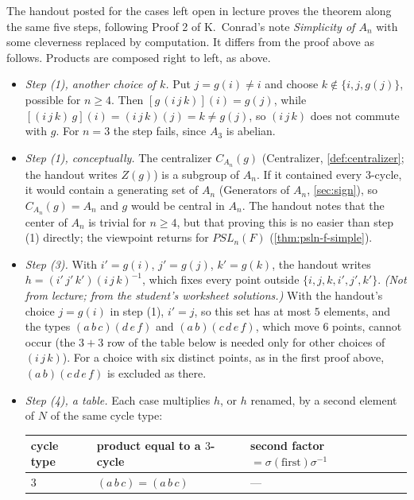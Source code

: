 \documentclass[11pt]{report}
\begin{document}
\begin{rembox}\label{rem:handout-simplicity-an}
The handout posted for the cases left open in lecture proves the theorem along the same five steps, following Proof 2 of K.~Conrad's note \emph{Simplicity of $A_n$} with some cleverness replaced by computation. It differs from the proof above as follows. Products are composed right to left, as above.
\begin{itemize}
    \item \emph{Step (1), another choice of $k$.} Put $j = g(i) \neq i$ and choose $k \notin \{i, j, g(j)\}$, possible for $n \geq 4$. Then $[g\,(i\,j\,k)](i) = g(j)$, while $[(i\,j\,k)\,g](i) = (i\,j\,k)(j) = k \neq g(j)$, so $(i\,j\,k)$ does not commute with $g$. For $n = 3$ the step fails, since $A_3$ is abelian.
    \item \emph{Step (1), conceptually.} The centralizer $C_{A_n}(g)$ (Centralizer, \ref{def:centralizer}; the handout writes $Z(g)$) is a subgroup of $A_n$. If it contained every $3$-cycle, it would contain a generating set of $A_n$ (Generators of $A_n$, \ref{sec:sign}), so $C_{A_n}(g) = A_n$ and $g$ would be central in $A_n$. The handout notes that the center of $A_n$ is trivial for $n \geq 4$, but that proving this is no easier than step (1) directly; the viewpoint returns for $PSL_n(F)$ (\ref{thm:psln-f-simple}).
    \item \emph{Step (3).} With $i' = g(i)$, $j' = g(j)$, $k' = g(k)$, the handout writes $h = (i'\,j'\,k')(i\,j\,k)^{-1}$, which fixes every point outside $\{i, j, k, i', j', k'\}$. \textit{(Not from lecture; from the student's worksheet solutions.)} With the handout's choice $j = g(i)$ in step (1), $i' = j$, so this set has at most $5$ elements, and the types $(a\,b\,c)(d\,e\,f)$ and $(a\,b)(c\,d\,e\,f)$, which move $6$ points, cannot occur (the $3+3$ row of the table below is needed only for other choices of $(i\,j\,k)$). For a choice with six distinct points, as in the first proof above, $(a\,b)(c\,d\,e\,f)$ is excluded as there.
    \item \emph{Step (4), a table.} Each case multiplies $h$, or $h$ renamed, by a second element of $N$ of the same cycle type:
    \begin{center}
    \begin{tabular}{l|l|l}
    cycle type & product equal to a $3$-cycle & second factor $= \sigma(\text{first})\sigma^{-1}$ \\ \hline
    $3$ & $(a\,b\,c) = (a\,b\,c)$ & --- \\

\end{tabular}
\end{center}
\end{itemize}
\end{rembox}
\end{document}

